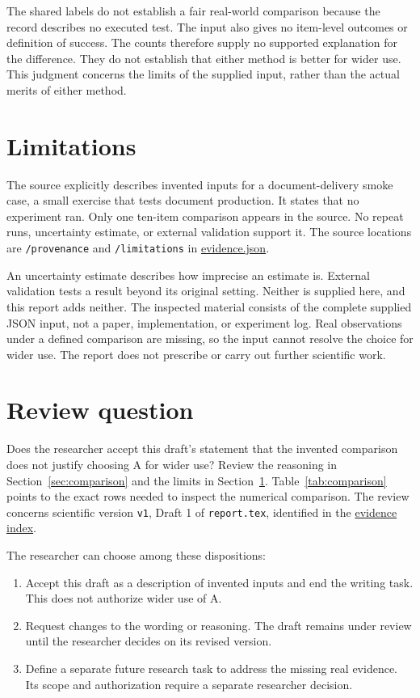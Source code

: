 \documentclass[lang=en,bibend=bibtex,a4paper,11pt]{elegantpaper}
\begin{document}
The shared labels do not establish a fair real-world comparison because the record describes no executed test.
The input also gives no item-level outcomes or definition of success.
The counts therefore supply no supported explanation for the difference.
They do not establish that either method is better for wider use.
This judgment concerns the limits of the supplied input, rather than the actual merits of either method.

\section{Limitations}
\label{sec:limitations}
The source explicitly describes invented inputs for a document-delivery smoke case, a small exercise that tests document production.
It states that no experiment ran.
Only one ten-item comparison appears in the source.
No repeat runs, uncertainty estimate, or external validation support it.
The source locations are \texttt{/provenance} and \texttt{/limitations} in \href{run:evidence.json}{evidence.json}.

An uncertainty estimate describes how imprecise an estimate is.
External validation tests a result beyond its original setting.
Neither is supplied here, and this report adds neither.
The inspected material consists of the complete supplied JSON input, not a paper, implementation, or experiment log.
Real observations under a defined comparison are missing, so the input cannot resolve the choice for wider use.
The report does not prescribe or carry out further scientific work.

\section{Review question}
\label{sec:review}
Does the researcher accept this draft's statement that the invented comparison does not justify choosing A for wider use?
Review the reasoning in Section~\ref{sec:comparison} and the limits in Section~\ref{sec:limitations}.
Table~\ref{tab:comparison} points to the exact rows needed to inspect the numerical comparison.
The review concerns scientific version \texttt{v1}, Draft 1 of \texttt{report.tex}, identified in the \href{run:evidence-index.json}{evidence index}.

The researcher can choose among these dispositions:
\begin{enumerate}
\item Accept this draft as a description of invented inputs and end the writing task. This does not authorize wider use of A.
\item Request changes to the wording or reasoning. The draft remains under review until the researcher decides on its revised version.
\item Define a separate future research task to address the missing real evidence. Its scope and authorization require a separate researcher decision.
\end{enumerate}
\end{document}

